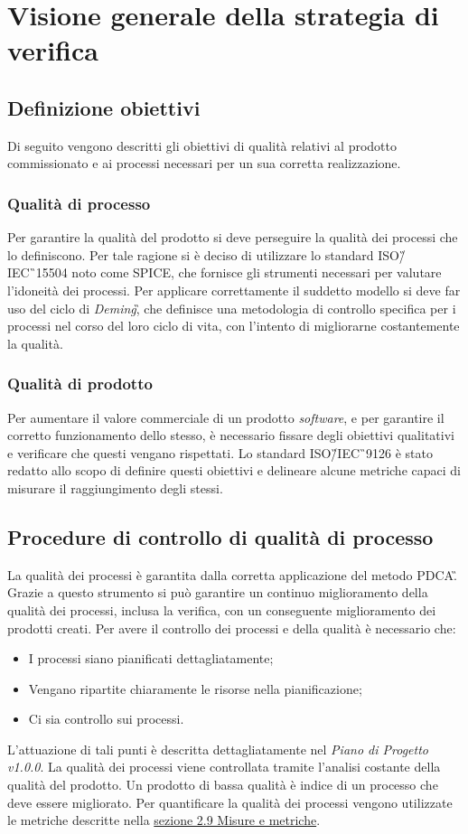 \section{Visione generale della strategia di verifica}
\subsection{Definizione obiettivi}
Di seguito vengono descritti gli obiettivi di qualità relativi al prodotto commissionato e ai processi necessari per un sua corretta realizzazione.
\subsubsection{Qualità di processo}
Per garantire la qualità del prodotto si deve perseguire la qualità dei processi che lo definiscono. Per tale ragione si è deciso di utilizzare lo standard ISO\G/IEC\G\ 15504 noto come SPICE, che fornisce gli strumenti necessari per valutare l'idoneità dei processi. Per applicare correttamente il suddetto modello si deve far uso del ciclo di \textit{Deming}\G, che definisce una metodologia di controllo specifica per i processi nel corso del loro ciclo di vita, con l'intento di migliorarne costantemente la qualità.

\subsubsection{Qualità di prodotto}
Per aumentare il valore commerciale di un prodotto \textit{software}, e per garantire il 
corretto funzionamento dello stesso, è necessario fissare degli obiettivi 
qualitativi e verificare che questi vengano rispettati. Lo standard ISO\G/IEC\G\ 9126 è stato redatto allo scopo di definire questi 
obiettivi e delineare alcune metriche capaci di misurare il raggiungimento 
degli stessi.

\subsection{Procedure di controllo di qualità di processo}
La qualità dei processi è garantita dalla corretta applicazione del metodo PDCA\G. 
Grazie a questo strumento si può garantire un continuo miglioramento della 
qualità dei processi, inclusa la verifica, con un conseguente 
miglioramento dei prodotti creati. 
Per avere il controllo dei processi e della qualità è necessario che:
\begin{itemize}
	\item	I processi siano pianificati dettagliatamente;
	\item	Vengano ripartite chiaramente le risorse nella pianificazione;
	\item	Ci sia controllo sui processi.
\end{itemize}
L'attuazione di tali punti è descritta dettagliatamente nel \textit{Piano di 
Progetto v1.0.0}. La qualità dei processi viene controllata tramite l'analisi costante della qualità del prodotto.  Un prodotto di bassa qualità è indice di un processo che deve essere migliorato. Per quantificare la qualità dei processi vengono utilizzate le metriche 
descritte nella \hyperref[cap:sezione 2.9 Misure e metriche]{sezione 2.9 Misure e metriche}.

